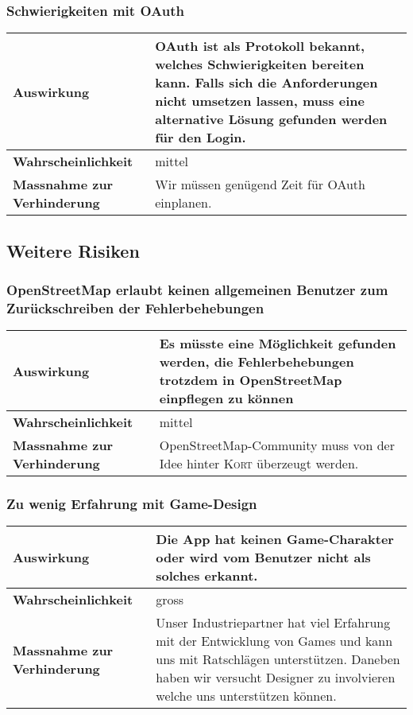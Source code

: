 \subsubsection{Schwierigkeiten mit OAuth}
\begin{table}[H]
\centering
\begin{tabular}{|p{0.25\twocelltabwidth}|p{0.75\twocelltabwidth}|}
\hline 
\small{\textbf{Auswirkung}} & OAuth ist als Protokoll bekannt, welches Schwierigkeiten bereiten kann.
Falls sich die Anforderungen nicht umsetzen lassen, muss eine alternative Lösung gefunden werden für den Login. \\
\hline 
\small{\textbf{Wahrscheinlichkeit}} & mittel \\
\hline 
\small{\textbf{Massnahme zur Verhinderung}} & Wir müssen genügend Zeit für OAuth einplanen. \\
\hline
\end{tabular}
\end{table}

\subsection{Weitere Risiken}

\subsubsection{OpenStreetMap erlaubt keinen allgemeinen Benutzer zum Zurückschreiben der Fehlerbehebungen}
\begin{table}[H]
\centering
\begin{tabular}{|p{0.25\twocelltabwidth}|p{0.75\twocelltabwidth}|}
\hline 
\small{\textbf{Auswirkung}} & Es müsste eine Möglichkeit gefunden werden, die Fehlerbehebungen trotzdem in \gls{OpenStreetMap} einpflegen zu können \\
\hline 
\small{\textbf{Wahrscheinlichkeit}} & mittel \\
\hline 
\small{\textbf{Massnahme zur Verhinderung}} & \gls{OpenStreetMap}-Community muss von der Idee hinter \textsc{Kort} überzeugt werden. \\
\hline
\end{tabular}
\end{table}

\subsubsection{Zu wenig Erfahrung mit Game-Design}
\begin{table}[H]
\centering
\begin{tabular}{|p{0.25\twocelltabwidth}|p{0.75\twocelltabwidth}|}
\hline 
\small{\textbf{Auswirkung}} & Die App hat keinen Game-Charakter oder wird vom Benutzer nicht als solches erkannt. \\
\hline 
\small{\textbf{Wahrscheinlichkeit}} & gross \\
\hline 
\small{\textbf{Massnahme zur Verhinderung}} & Unser Industriepartner hat viel Erfahrung mit der Entwicklung von Games und kann uns mit Ratschlägen unterstützen.
Daneben haben wir versucht Designer zu involvieren welche uns unterstützen können. \\
\hline
\end{tabular}
\end{table}